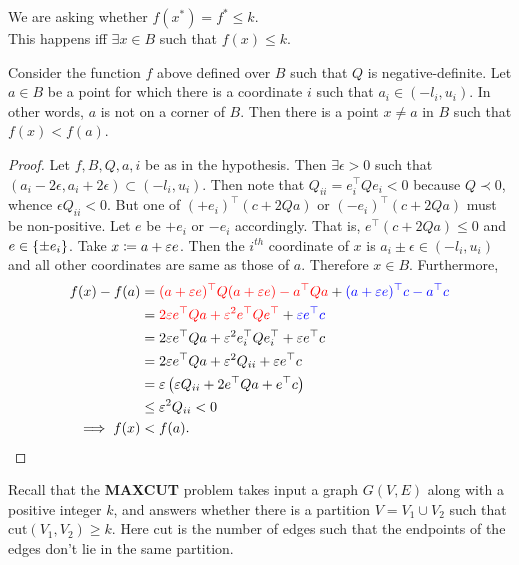 We are asking whether $f(x^{*}) = f^{*} \le k$. \\
This happens iff $\exists x\in B$ such that $f(x)\le k$.

\begin{lemma}\label{corner}
Consider the function $f$ above defined over $B$ such that $Q$ is negative-definite. Let $a\in B$ be a point for which there is a coordinate $i$ such that $a_{i}\in (-l_{i},u_{i})$. In other words, $a$ is not on a corner of $B$. Then there is a point $x\neq a$ in $B$ such that $f(x) < f(a)$. 
\end{lemma}
\begin{proof}
Let $f,B,Q,a,i$ be as in the hypothesis. Then $\exists \epsilon>0$ such that $(a_{i}-2\epsilon,a_{i} +2\epsilon)\subset (-l_{i},u_{i})$. Then note that $Q_{ii} = e_{i}^{\top}Qe_{i} < 0$ because $Q\prec 0$, whence $\epsilon Q_{ii} < 0$. But one of $(+e_{i})^{\top}(c + 2Qa)$ or $(-e_{i})^{\top}(c + 2Qa)$ must be non-positive. Let $e$ be $+e_{i}$ or $-e_{i}$ accordingly. That is, $e^{\top}(c + 2Qa) \le 0$ and $e \in\set{\pm e_{i}}$. Take $x \sett a+\epsilon e$. Then the $i^{th}$ coordinate of $x$ is $a_{i}\pm\epsilon \in (-l_{i},u_{i})$ and all other coordinates are same as those of $a$. Therefore $x\in B$. Furthermore, \begin{align*}
f(x) - f(a) &= {\color{red}(a+\epsilon e)^{\top}Q(a+\epsilon e) - a^{\top}Qa} + {\color{blue}(a+\epsilon e)^{\top}c - a^{\top}c}\\
&= {\color{red}2\epsilon e^{\top} Qa + \epsilon^{2} e^{\top}Qe^{\top}} + {\color{blue} \epsilon e^{\top}c}\\
&= 2\epsilon e^{\top} Qa + \epsilon^{2} e_{i}^{\top}Qe_{i}^{\top} + \epsilon e^{\top}c\\
&= 2\epsilon e^{\top} Qa + \epsilon^{2} Q_{ii} + \epsilon e^{\top}c\\
&= \epsilon\left(\epsilon Q_{ii} + 2e^{\top}Qa + e^{\top}c\right)\\
&\le \epsilon^{2}Q_{ii} < 0\\
\implies f(x) &< f(a).
\end{align*}
\end{proof}


Recall that the \textbf{MAXCUT} problem takes input a graph $G(V,E)$ along with a positive integer $k$, and answers whether there is a partition $V = V_{1}\cup V_{2}$ such that $\text{cut}(V_{1},V_{2}) \ge k$. Here $\text{cut}$ is the number of edges such that the endpoints of the edges don't lie in the same partition. 

